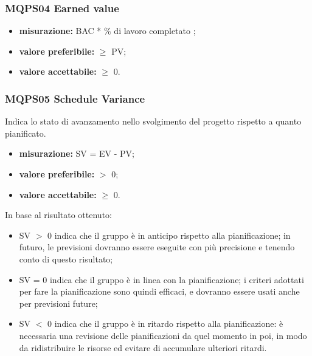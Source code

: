 \subsubsection{MQPS04 Earned value}\label{2.1.3.4}
\begin{itemize}
	\item \textbf{misurazione:}  BAC * \% di lavoro completato ;
	\item \textbf{valore preferibile:} $\geq$ PV;
	\item \textbf{valore accettabile:} $\geq$ 0.
\end{itemize}

\subsubsection{MQPS05 Schedule Variance}\label{2.1.3.5}
Indica lo stato di avanzamento nello svolgimento del progetto rispetto a quanto pianificato.
\begin{itemize}
	\item \textbf{misurazione:} SV = EV - PV;
	\item \textbf{valore preferibile:} $>$ 0;
	\item \textbf{valore accettabile:} $\geq$ 0.
\end{itemize}
In base al risultato ottenuto:
\begin{itemize}
	\item SV $>$ 0  indica che il gruppo è in anticipo rispetto alla pianificazione; in futuro,
	le previsioni dovranno essere eseguite con più precisione e tenendo conto di questo
	risultato;
	\item SV = 0  indica che il gruppo è in linea con la pianificazione; i criteri adottati per
	fare la pianificazione sono quindi efficaci, e dovranno essere usati anche per previsioni
	future;
	\item SV $<$ 0 indica che il gruppo è in ritardo rispetto alla pianificazione: è necessaria
	una revisione delle pianificazioni da quel momento in poi, in modo da ridistribuire le
	risorse ed evitare di accumulare ulteriori ritardi.
\end{itemize}

